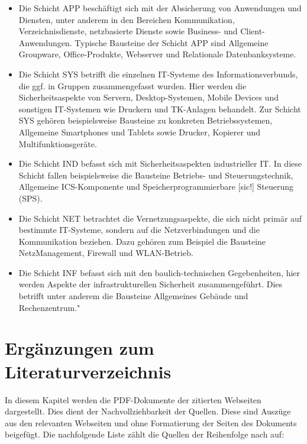 \begin{itemize}
	\item Die Schicht APP beschäftigt sich mit der Absicherung von Anwendungen und Diensten, unter anderem in den
	Bereichen Kommunikation, Verzeichnisdienste, netzbasierte Dienste sowie Business- und Client-Anwendungen.
	Typische Bausteine der Schicht APP sind Allgemeine Groupware, Office-Produkte, Webserver und Relationale
	Datenbanksysteme.
	\item Die Schicht SYS betrifft die einzelnen IT-Systeme des Informationsverbunds, die ggf. in Gruppen zusammengefasst wurden. Hier werden die Sicherheitsaspekte von Servern, Desktop-Systemen, Mobile Devices und sonstigen IT-Systemen wie Druckern und TK-Anlagen behandelt. Zur Schicht SYS gehören beispielsweise Bausteine zu
	konkreten Betriebssystemen, Allgemeine Smartphones und Tablets sowie Drucker, Kopierer und Multifunktionsgeräte.
	\item Die Schicht IND befasst sich mit Sicherheitsaspekten industrieller IT. In diese Schicht fallen beispielsweise die Bausteine Betriebs- und Steuerungstechnik, Allgemeine ICS-Komponente und Speicherprogrammierbare [sic!] Steuerung (SPS).
	\item Die Schicht NET betrachtet die Vernetzungsaspekte, die sich nicht primär auf bestimmte IT-Systeme, sondern
	auf die Netzverbindungen und die Kommunikation beziehen. Dazu gehören zum Beispiel die Bausteine NetzManagement, Firewall und WLAN-Betrieb.
	\item Die Schicht INF befasst sich mit den baulich-technischen Gegebenheiten, hier werden Aspekte der infrastrukturellen Sicherheit zusammengeführt. Dies betrifft unter anderem die Bausteine Allgemeines Gebäude und Rechenzentrum."\autocite[][S.\,23-24]{bundesamt_fur_sicherheit_in_der_informationstechnik_bsi_it-grundschutz-kompendium_2020}
\end{itemize}



\chapter{Ergänzungen zum Literaturverzeichnis}
In diesem Kapitel werden die PDF-Dokumente der zitierten Webseiten dargestellt. Dies dient der Nachvollziehbarkeit der Quellen. Diese sind Auszüge aus den relevanten Webseiten und ohne Formatierung der Seiten des Dokuments beigefügt. Die nachfolgende Liste zählt die Quellen der Reihenfolge nach auf:


